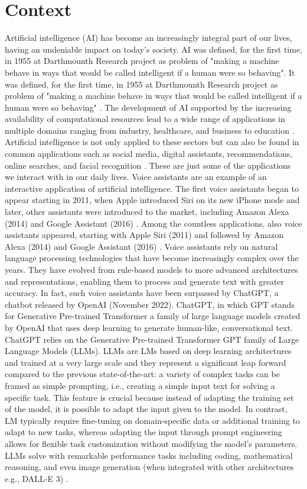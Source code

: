 \section{Context}
Artificial intelligence (AI) has become an increasingly integral part of our lives, having an undeniable impact on today’s society. AI was defined, for the first time, in 1955 at Darthmounth Research project as problem of "making a machine behave in ways that would be called intelligent if a human were so behaving"\cite{kaplan2019siri}. 
It was defined, for the first time, in 1955 at Darthmounth Research project as problem of "making a machine behave in ways that would be called intelligent if a human were so behaving" \cite{kaplan2019siri}. The development of AI supported by the increasing availability of computational resources lead to a wide range of applications in multiple domains ranging from industry, healthcare, and business to education \cite{busnatu2022clinical}.  Artificial intelligence is not only applied to these sectors but can also be found in common applications such as social media, digital assistants, recommendations, online searches, and facial recognition \cite{ref1}. These are just some of the applications we interact with in our daily lives. Voice assistants are an example of an interactive application of artificial intelligence. The first voice assistants began to appear starting in 2011, when Apple introduced Siri on its new iPhone mode and later, other assistants were introduced to the market, including Amazon Alexa (2014) and Google Assistant (2016) \cite{ref2}.
Among the countless applications, also voice assistants appeared, starting with Apple Siri (2011) and followed by Amazon Alexa (2014) and Google Assistant (2016) \cite{ref2}. Voice assistants rely on natural language processing technologies that have become increasingly complex over the years. They have evolved from rule-based models to more advanced architectures and representations, enabling them to process and generate text with greater accuracy. In fact, such voice assistants have been surpassed by ChatGPT, a chatbot released by OpenAI (November 2022). ChatGPT, in which GPT stands for Generative Pre-trained Transformer a family of large language models created by OpenAI that uses deep learning to generate human-like, conversational text.
ChatGPT relies on the Generative Pre-trained Transformer GPT family of Large Language Models (LLMs).
LLMs are LMs based on deep learning architectures and trained at a very large scale and they represent a significant leap forward compared to the previous state-of-the-art: a variety of complex tasks can be framed as simple prompting, i.e., creating a simple input text for solving a specific task. This feature is crucial because instead of adapting the training set of the model, it is possible to adapt the input given to the model.
In contrast, LM typically require fine-tuning on domain-specific data or additional training to adapt to new tasks, whereas adapting the input through prompt engineering allows for flexible task customization without modifying the model's parameters.
LLMs solve with remarkable performance tasks including coding, mathematical reasoning, and even image generation (when integrated with other architectures e.g., DALL-E 3) \cite{ref3}.

